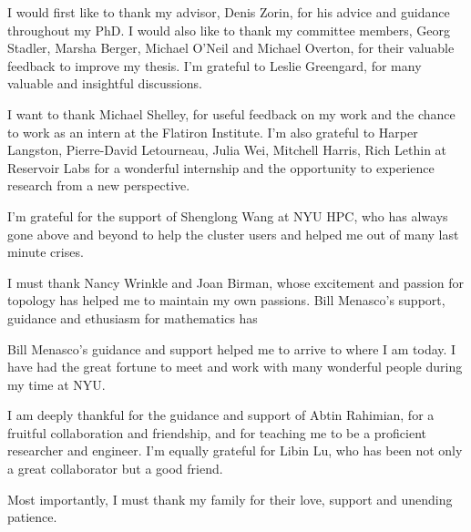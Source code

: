 I would first like to thank my advisor, Denis Zorin, for his advice and guidance throughout my PhD. 
I would also like to thank my committee members, Georg Stadler, Marsha Berger, Michael O'Neil and Michael Overton, for their valuable feedback to improve my thesis.
I'm grateful to Leslie Greengard, for many valuable and insightful discussions.

I want to thank Michael Shelley, for useful feedback on my work and the chance to work as an intern at the Flatiron Institute.
I'm also grateful to Harper Langston, Pierre-David Letourneau, Julia Wei, Mitchell Harris, Rich Lethin at Reservoir Labs for a wonderful internship and the opportunity to experience research from a new perspective.

I'm grateful for the support of Shenglong Wang at NYU HPC, who has always gone above and beyond to help the cluster users and helped me out of many last minute crises.

I must thank Nancy Wrinkle and Joan Birman, whose excitement and passion for topology has helped me to maintain my own passions. Bill Menasco's support, guidance and ethusiasm for mathematics has 

Bill Menasco's guidance and support helped me to arrive to where I am today.
I have had the great fortune to meet and work with many wonderful people during my time at NYU.

I am deeply thankful for the guidance and support of Abtin Rahimian, for a fruitful collaboration and friendship, and for teaching me to be a proficient researcher and engineer.
I'm equally grateful for Libin Lu, who has been not only a great collaborator but a good friend.

Most importantly, I must thank my family for their love, support and unending patience.

